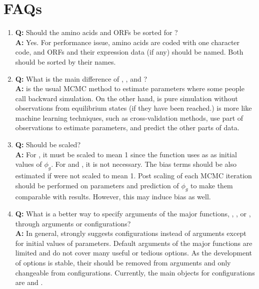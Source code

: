 
\section[FAQs]{FAQs}
\label{sec:faqs}

\begin{enumerate}

\item {\bf\color{blue} Q:}
      Should the amino acids and ORFs be sorted for ? \\
      {\bf\color{blue} A:}
      Yes. For performance issue, amino acids are coded with one character
      code, and ORFs and their expression data (if any) should be named.
      Both should be sorted by their names.

\item {\bf\color{blue} Q:}
      What is the main difference of , , and
      ? \\
      {\bf\color{blue} A:}
       is the usual MCMC method to estimate parameters where
      some people call backward simulation.
      On the other hand,  is pure simulation without
      observations from equilibrium states (if they have been reached.)
       is more like machine learning techniques, such as
      cross-validation methods, use part of observations to estimate
      parameters, and predict the other parts of data.

\item {\bf\color{blue} Q:}
      Should  be scaled? \\
      {\bf\color{blue} A:}
      For , it must be scaled to mean 1 since the function uses
      as  as initial values of $\phi_g$.
      For  and , it is not necessary. The
      bias terms should be also estimated if  were not
      scaled to mean 1. Post scaling of each MCMC iteration should be
      performed on parameters and prediction of $\phi_g$ to make them
      comparable with  results. However, this may induce
      bias as well.

\item {\bf\color{blue} Q:}
      What is a better way to specify arguments of the major functions,
      , , or ,
      through arguments or configurations?\\
      {\bf\color{blue} A:}
      In general,  strongly suggests configurations instead of
      arguments except for initial values of parameters. Default arguments of
      the major functions are limited and do not cover many useful or tedious
      options. As the development of options is stable, their should be removed
      from arguments and only changeable from configurations. Currently,
      the main objects for configurations are  and .


\end{enumerate}

